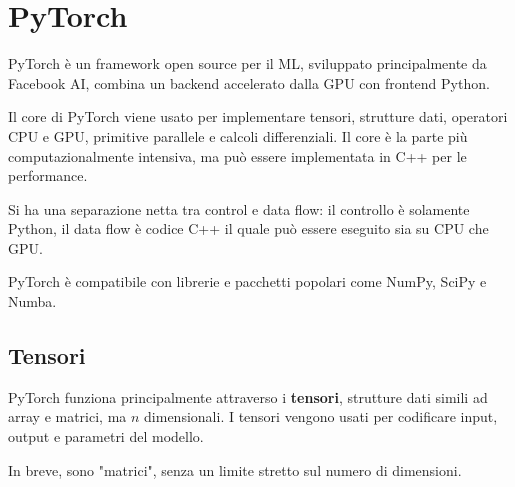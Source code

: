 \section{PyTorch}

PyTorch è un framework open source per il ML, sviluppato principalmente da Facebook AI, combina un backend accelerato dalla GPU con frontend Python. 

Il core di PyTorch viene usato per implementare tensori, strutture dati, operatori CPU e GPU, primitive parallele e calcoli differenziali. Il core è la parte più computazionalmente intensiva, ma può essere implementata in C++ per le performance.

Si ha una separazione netta tra control e data flow: il controllo è solamente Python, il data flow è codice C++ il quale può essere eseguito sia su CPU che GPU.

PyTorch è compatibile con librerie e pacchetti popolari come NumPy, SciPy e Numba.

\subsection{Tensori}

PyTorch funziona principalmente attraverso i \textbf{tensori}, strutture dati simili ad array e matrici, ma $n$ dimensionali. I tensori vengono usati per codificare input, output e parametri del modello.

In breve, sono "matrici", senza un limite stretto sul numero di dimensioni.

